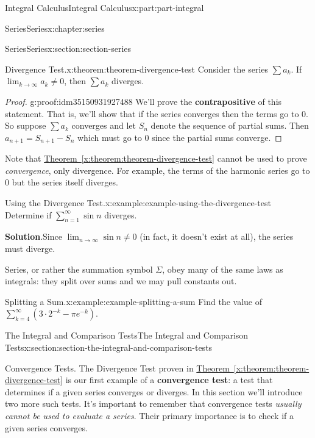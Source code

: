 \documentclass[twoside,10pt,]{book}
\newcommand{\blocktitlefont}{\relax}
\newcommand{\xreffont}{\relax}
\newcommand{\terminology}[1]{\textbf{#1}}
\numberwithin{equation}{part}
\begin{document}
\begin{partptx}{Integral Calculus}{}{Integral Calculus}{}{}{x:part:part-integral}
\begin{chapterptx}{Series}{}{Series}{}{}{x:chapter:series}
\begin{sectionptx}{Series}{}{Series}{}{}{x:section:section-series}
\begin{theorem}{Divergence Test.}{}{x:theorem:theorem-divergence-test}%
Consider the series \(\sum a_{k}\). If \(\lim_{k\to\infty}a_{k}\neq0\), then \(\sum a_{k}\) diverges.%
\end{theorem}
\begin{proof}{}{g:proof:idm35150931927488}
We'll prove the \terminology{contrapositive} of this statement. That is, we'll show that if the series converges then the terms go to \(0\). So suppose \(\sum a_{k}\) converges and let \(S_{n}\) denote the sequence of partial sums. Then \(a_{n+1} = S_{n+1} - S_{n}\) which must go to \(0\) since the partial sums converge.%
\end{proof}
Note that \hyperref[x:theorem:theorem-divergence-test]{Theorem~{\xreffont\ref{x:theorem:theorem-divergence-test}}} cannot be used to prove \emph{convergence}, only divergence. For example, the terms of the harmonic series go to \(0\) but the series itself diverges.%
\begin{example}{Using the Divergence Test.}{x:example:example-using-the-divergence-test}%
Determine if \(\sum_{n=1}^{\infty}\sin n\) diverges.%
\par\smallskip%
\noindent\textbf{\blocktitlefont Solution}.\hypertarget{g:solution:idm35150931921856}{}\quad{}Since \(\lim_{n\to\infty}\sin n\neq 0\) (in fact, it doesn't exist at all), the series must diverge.%
\end{example}
Series, or rather the summation symbol \(\Sigma\), obey many of the same laws as integrals: they split over sums and we may pull constants out.%
\begin{example}{Splitting a Sum.}{x:example:example-splitting-a-sum}%
Find the value of \(\sum_{k=4}^{\infty}\left(3\cdot2^{-k} - \pi e^{-k}\right)\).%
\end{example}
\end{sectionptx}
%
%
\typeout{************************************************}
\typeout{************************************************}
%
\begin{sectionptx}{The Integral and Comparison Tests}{}{The Integral and Comparison Tests}{}{}{x:section:section-the-integral-and-comparison-tests}
\begin{introduction}{Convergence Tests.}%
The Divergence Test proven in \hyperref[x:theorem:theorem-divergence-test]{Theorem~{\xreffont\ref{x:theorem:theorem-divergence-test}}} is our first example of a \terminology{convergence test}: a test that determines if a given series converges or diverges. In this section we'll introduce two more such tests. It's important to remember that convergence tests \emph{usually cannot be used to evaluate a series}. Their primary importance is to check if a given series converges.%

\end{introduction}
\end{sectionptx}
\end{chapterptx}
\end{partptx}
\end{document}
